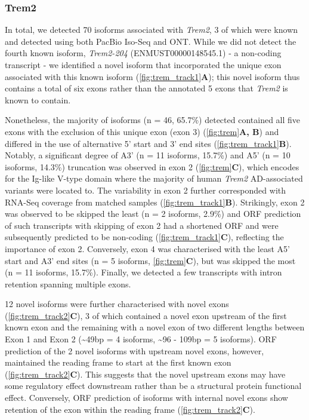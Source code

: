 \subsubsection{Trem2}
In total, we detected 70 isoforms associated with \textit{Trem2}, 3 of which were known and detected using both PacBio Iso-Seq and ONT. While we did not detect the fourth known isoform, \textit{Trem2-204} (ENMUST00000148545.1) - a non-coding transcript - we identified a novel isoform that incorporated the unique exon associated with this known isoform (\cref{fig:trem_track1}\textbf{A}); this novel isoform thus contains a total of six exons rather than the annotated 5 exons that \textit{Trem2} is known to contain.   

Nonetheless, the majority of isoforms (n = 46, 65.7\%) detected contained all five exons with the exclusion of this unique exon (exon 3) (\cref{fig:trem}\textbf{A, B}) and differed in the use of alternative 5' start and 3' end sites (\cref{fig:trem_track1}\textbf{B}). Notably, a significant degree of A3' (n = 11 isoforms, 15.7\%) and A5' (n = 10 isoforms, 14.3\%) truncation was observed in exon 2 (\cref{fig:trem}\textbf{C}), which encodes for the Ig-like V-type domain where the majority of human \textit{Trem2} AD-associated variants were located to. The variability in exon 2 further corresponded with RNA-Seq coverage from matched samples (\cref{fig:trem_track1}\textbf{B}). Strikingly, exon 2 was observed to be skipped the least (n = 2 isoforms, 2.9\%) and ORF prediction of such transcripts with skipping of exon 2 had a shortened ORF and were subsequently predicted to be non-coding (\cref{fig:trem_track1}\textbf{C}), reflecting the importance of exon 2. Conversely, exon 4 was characterised with the least A5' start and A3' end sites (n = 5 isoforms, \cref{fig:trem}\textbf{C}), but was skipped the most (n = 11 isoforms, 15.7\%). Finally, we detected a few transcripts with intron retention spanning multiple exons. 

12 novel isoforms were further characterised with novel exons (\cref{fig:trem_track2}\textbf{C}), 3 of which contained a novel exon upstream of the first known exon and the remaining with a novel exon of two different lengths between Exon 1 and Exon 2 (\textasciitilde49bp = 4 isoforms, \textasciitilde96 - 109bp = 5 isoforms). ORF prediction of the 2 novel isoforms with upstream novel exons, however, maintained the reading frame to start at the first known exon (\cref{fig:trem_track2}\textbf{C}). This suggests that the novel upstream exons may have some regulatory effect downstream rather than be a structural protein functional effect. Conversely, ORF prediction of isoforms with internal novel exons show retention of the exon within the reading frame (\cref{fig:trem_track2}\textbf{C}). 

